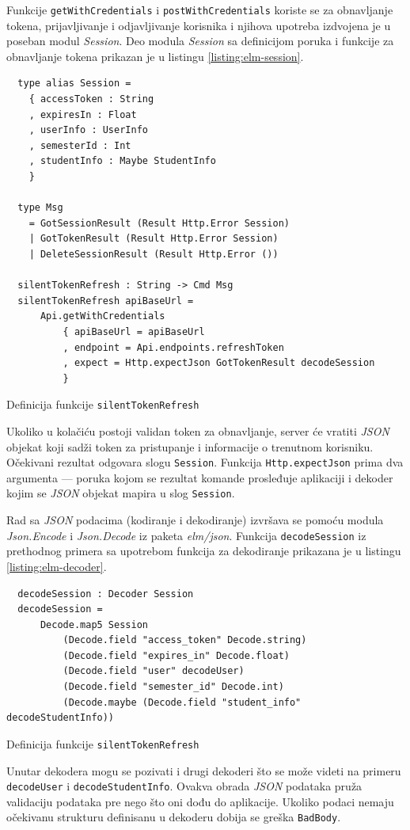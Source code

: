 \documentclass[12pt,oneside]{memoir}
\begin{document}
Funkcije \texttt{getWithCredentials} i \texttt{postWithCredentials} koriste se za obnavljanje tokena,
prijavljivanje i odjavljivanje korisnika i njihova upotreba izdvojena je u poseban modul \emph{Session}.
Deo modula \emph{Session} sa definicijom poruka i funkcije za obnavljanje tokena
prikazan je u listingu \ref{listing:elm-session}.
\begin{listing}[h]
\begin{verbatim}
  type alias Session =
    { accessToken : String
    , expiresIn : Float
    , userInfo : UserInfo
    , semesterId : Int
    , studentInfo : Maybe StudentInfo
    }

  type Msg
    = GotSessionResult (Result Http.Error Session)
    | GotTokenResult (Result Http.Error Session)
    | DeleteSessionResult (Result Http.Error ())

  silentTokenRefresh : String -> Cmd Msg
  silentTokenRefresh apiBaseUrl =
      Api.getWithCredentials
          { apiBaseUrl = apiBaseUrl
          , endpoint = Api.endpoints.refreshToken
          , expect = Http.expectJson GotTokenResult decodeSession
          }
\end{verbatim}
\caption{Definicija funkcije \texttt{silentTokenRefresh}}
\label{listing:elm-session}
\end{listing}
Ukoliko u kolačiću postoji validan token za obnavljanje, server će vratiti \emph{JSON} objekat koji sadži token za pristupanje i informacije o trenutnom korisniku.
Očekivani rezultat odgovara slogu \texttt{Session}. Funkcija \texttt{Http.expectJson} prima dva argumenta --- poruka kojom se rezultat komande prosleđuje aplikaciji
i dekoder kojim se \emph{JSON} objekat mapira u slog \texttt{Session}. 

Rad sa \emph{JSON} podacima (kodiranje i dekodiranje) izvršava se pomoću modula \emph{Json.Encode} i \emph{Json.Decode} iz paketa \emph{elm/json}.
Funkcija \texttt{decodeSession} iz prethodnog primera sa upotrebom funkcija za dekodiranje prikazana je u listingu \ref{listing:elm-decoder}.
\begin{listing}[h]
\begin{verbatim}
  decodeSession : Decoder Session
  decodeSession =
      Decode.map5 Session
          (Decode.field "access_token" Decode.string)
          (Decode.field "expires_in" Decode.float)
          (Decode.field "user" decodeUser)
          (Decode.field "semester_id" Decode.int)
          (Decode.maybe (Decode.field "student_info" decodeStudentInfo))
\end{verbatim}
\caption{Definicija funkcije \texttt{silentTokenRefresh}}
\label{listing:elm-decoder}
\end{listing}
Unutar dekodera mogu se pozivati i drugi dekoderi što se može videti na primeru \texttt{decodeUser} i \texttt{decodeStudentInfo}.
Ovakva obrada \emph{JSON} podataka pruža validaciju podataka pre nego što oni dođu do aplikacije. Ukoliko podaci nemaju očekivanu strukturu
definisanu u dekoderu dobija se greška \texttt{BadBody}.
\end{document}
